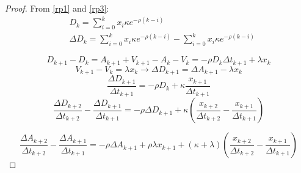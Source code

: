 \begin{appendices}
\begin{proof}
        From \eqref{rp1} and \eqref{rp3}:
        \begin{align*}
                & D_k = \sum _{i=0} ^k x_i \kappa e^{- \rho (k - i)} \\
                & \Delta D_k = \sum _{i=0} ^k x_i \kappa e^{- \rho (k - i)} - \sum _{i=0} ^k x_i \kappa e^{- \rho (k - i)}
        \end{align*}


        \[ D_{k+1} - D_k = A_{k+1} + V_{k+1} - A_{k} - V_{k} = -\rho D_k \Delta t_{k+1} + \lambda x_{k} \]
        \[ V_{k+1} - V_k = \lambda x_{k} \rightarrow \Delta D_{k+1} = \Delta A_{k+1} - \lambda x_k \] 
        \[ \frac{\Delta D_{k+1}}{\Delta t_{k+1}} = - \rho D_k + \kappa \frac{x_{k+1}}{\Delta t_{k+1}} \] 
        \[ \frac{\Delta D_{k+2}}{\Delta t_{k+2}} - \frac{\Delta D_{k+1}}{\Delta t_{k+1}} 
            = - \rho \Delta D_{k+1} + \kappa ( \frac{x_{k+2}}{\Delta t_{k+2}} - \frac{x_{k+1}}{\Delta t_{k+1}}) \] 
        
        \[ \frac{\Delta A_{k+2}}{\Delta t_{k+2}} - \frac{\Delta A_{k+1}}{\Delta t_{k+1}} 
            = - \rho \Delta A_{k+1} + \rho \lambda x_{k+1} + (\kappa + \lambda) (\frac{x_{k+2}}{\Delta t_{k+2}} - \frac{x_{k+1}}{\Delta t_{k+1}}) \] 
       

\end{proof}
	
\end{appendices}   %